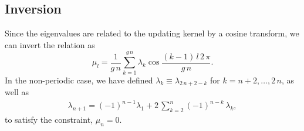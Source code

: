 \documentclass[reprint, superscriptaddress, floatfix]{revtex4-1}
\begin{document}


\subsection{\label{sec:invert_wband}
Inversion}

Since the eigenvalues are related to the updating kernel
by a cosine transform,
we can invert the relation as
%
\begin{equation}
  \mu_l
  =
  \frac { 1 } { g \, n }
  \sum_{ k = 1 }^{ g \, n }
  \lambda_k
  \cos \frac{ (k - 1) \, l \, 2 \, \pi }
            {            g \, n        }
  .
\label{eq:mu_from_lambda}
\end{equation}
%
In the non-periodic case,
we have defined
$\lambda_k \equiv \lambda_{2 \, n + 2 - k}$
for $k = n + 2, \dots, 2 \, n$,
as well as
%
\begin{align}
  \lambda_{ n + 1 }
  =
  (-1)^{ n - 1 }
  \lambda_1
  +
  2 \, \sum_{ k = 2 }^{ n }
      (-1)^{n - k} \, \lambda_k
  ,
\label{eq:lambdan}
\end{align}
to satisfy the constraint, $\mu_n = 0$.
%
\end{document}
